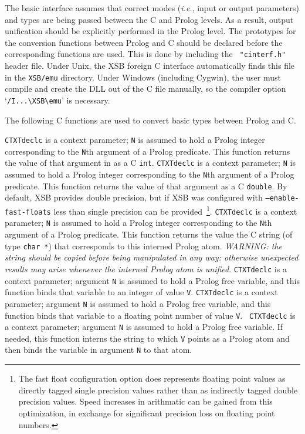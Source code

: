 The basic interface assumes that correct modes ({\it i.e.}, input or
output parameters) and types are being passed between the C and Prolog
levels.  As a result, output unification should be explicitly
performed in the Prolog level.  The prototypes for the conversion
functions between Prolog and C should be declared before the
corresponding functions are used.  This is done by including the {\tt
  "cinterf.h"} header file.  Under Unix, the XSB foreign C interface
automatically finds this file in the {\tt XSB/emu} directory. Under
Windows (including Cygwin), the user must compile and create the DLL
out of the C file manually, so the compiler option
`\verb|/I...\XSB\emu|' is necessary.

The following C functions are used to convert basic types between
Prolog and C.
\begin{description}
 {\tt CTXTdeclc} is a context
parameter; {\tt N} is assumed to hold a Prolog integer corresponding
to the {\tt N}th argument of a Prolog predicate.  This function
returns the value of that argument in as a C {\tt int}.
%
 {\tt CTXTdeclc} is a
context parameter; {\tt N} is assumed to hold a Prolog integer
corresponding to the {\tt N}th argument of a Prolog predicate.  This
function returns the value of that argument as a C {\tt double}.  By
default, XSB provides double precision, but if XSB was configured with
{\tt --enable-fast-floats} less than single precision can be
provided~\footnote{The fast float configuration option does represents
  floating point values as directly tagged single precision values
  rather than as indirectly tagged double precision values. Speed
  increases in arithmatic can be gained from this optimization, in
  exchange for significant precision loss on floating point numbers.}.
%
 {\tt CTXTdeclc} is a
context parameter; {\tt N} is assumed to hold a Prolog integer
corresponding to the {\tt N}th argument of a Prolog predicate.  This
function returns the value the C string (of type {\tt char *}) that
corresponds to this interned Prolog atom.  {\em WARNING: the string
  should be copied before being manipulated in any way: otherwise
  unexpected results may arise whenever the interned Prolog atom is
  unified}.
%
 {\tt CTXTdeclc} is a
context parameter; argument {\tt N} is assumed to hold a Prolog free
variable, and this function binds that variable to an integer of value
{\tt V}.
%
 {\tt CTXTdeclc} is a
context parameter; argument {\tt N} is assumed to hold a Prolog free
variable, and this function binds that variable to a floating point
number of value {\tt V}.
%
 {\tt
  CTXTdeclc} is a context parameter; argument {\tt N} is assumed to
hold a Prolog free variable.  If needed, this function interns the
string to which {\tt V} points as a Prolog atom and then binds the
variable in argument {\tt N} to that atom.
\end{description}


